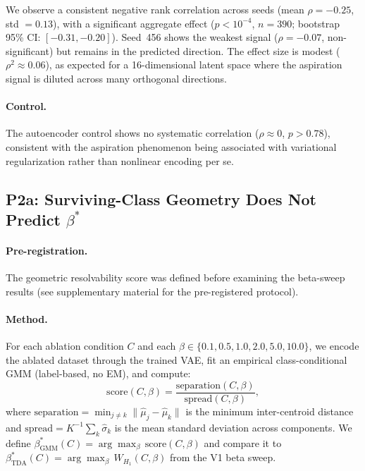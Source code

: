 \documentclass[11pt]{article}
\begin{document}
We observe a consistent negative rank correlation across seeds (mean
$\rho = -0.25$, std $= 0.13$), with a significant aggregate effect
($p < 10^{-4}$, $n = 390$; bootstrap 95\% CI: $[-0.31, -0.20]$).
Seed~456 shows the weakest signal ($\rho = -0.07$, non-significant)
but remains in the predicted direction.
The effect size is modest ($\rho^2 \approx 0.06$), as expected for a
16-dimensional latent space where the aspiration signal is diluted across
many orthogonal directions.

\paragraph{Control.}
The autoencoder control shows no systematic correlation
($\rho \approx 0$, $p > 0.78$), consistent with the aspiration phenomenon
being associated with variational regularization rather than nonlinear
encoding per se.


\subsection{P2a: Surviving-Class Geometry Does Not Predict $\beta^*$}
\label{sec:p2a}

\paragraph{Pre-registration.}
The geometric resolvability score was defined before examining the
beta-sweep results (see supplementary material for the pre-registered
protocol).

\paragraph{Method.}
For each ablation condition $C$ and each $\beta \in \{0.1, 0.5, 1.0,
2.0, 5.0, 10.0\}$, we encode the ablated dataset through the trained VAE,
fit an empirical class-conditional GMM (label-based, no EM), and compute:
\begin{equation}
\text{score}(C, \beta) =
  \frac{\text{separation}(C, \beta)}{\text{spread}(C, \beta)},
\end{equation}
where $\text{separation} = \min_{j \neq k}\|\hat{\mu}_j - \hat{\mu}_k\|$
is the minimum inter-centroid distance and
$\text{spread} = K^{-1}\sum_k \hat{\sigma}_k$ is the mean standard
deviation across components.
We define $\beta^*_{\text{GMM}}(C) = \arg\max_\beta\, \text{score}(C, \beta)$
and compare it to
$\beta^*_{\text{TDA}}(C) = \arg\max_\beta\, W_{H_1}(C, \beta)$
from the V1 beta sweep.
\end{document}
